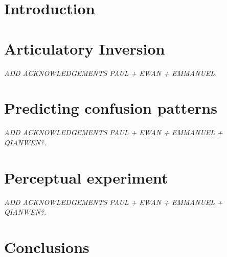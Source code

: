 

\section{Introduction}







\section{Articulatory Inversion}
\small{\textit{{\color{red}ADD ACKNOWLEDGEMENTS PAUL + EWAN + EMMANUEL.\\}}}


\section{Predicting confusion patterns}
\small{\textit{{\color{red}ADD ACKNOWLEDGEMENTS PAUL + EWAN + EMMANUEL + QIANWEN?.\\}}}


\section{Perceptual experiment}
\small{\textit{{\color{red}ADD ACKNOWLEDGEMENTS PAUL + EWAN + EMMANUEL + QIANWEN?.\\}}}

\section{Conclusions}



